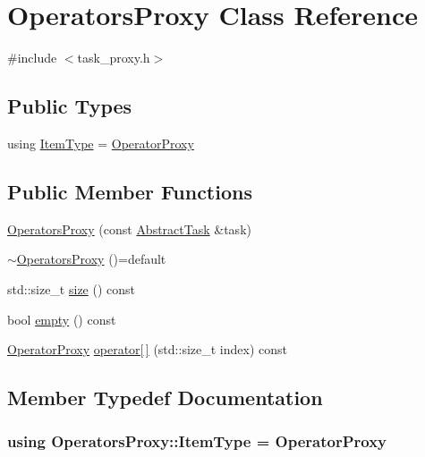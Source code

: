 \hypertarget{classOperatorsProxy}{\section{Operators\-Proxy Class Reference}
\label{classOperatorsProxy}
}


{\ttfamily \#include $<$task\-\_\-proxy.\-h$>$}

\subsection*{Public Types}
\begin{DoxyCompactItemize}
\item 
using \hyperlink{classOperatorsProxy_a939f7923474cafe6703e8d751a4ec214}{Item\-Type} = \hyperlink{classOperatorProxy}{Operator\-Proxy}
\end{DoxyCompactItemize}
\subsection*{Public Member Functions}
\begin{DoxyCompactItemize}
\item 
\hyperlink{classOperatorsProxy_abe16280c73e618d235befc07d32d499f}{Operators\-Proxy} (const \hyperlink{classAbstractTask}{Abstract\-Task} \&task)
\item 
\hyperlink{classOperatorsProxy_a3fa76f822ca3a49c5aa4f0ed029df8c9}{$\sim$\-Operators\-Proxy} ()=default
\item 
std\-::size\-\_\-t \hyperlink{classOperatorsProxy_a25f2894eab5294000cabbd01557e08f8}{size} () const 
\item 
bool \hyperlink{classOperatorsProxy_af3146b105a508de47adce891272c4307}{empty} () const 
\item 
\hyperlink{classOperatorProxy}{Operator\-Proxy} \hyperlink{classOperatorsProxy_a153274802a51f1560fbfb09a0199c9eb}{operator\mbox{[}$\,$\mbox{]}} (std\-::size\-\_\-t index) const 
\end{DoxyCompactItemize}


\subsection{Member Typedef Documentation}
\hypertarget{classOperatorsProxy_a939f7923474cafe6703e8d751a4ec214}{
\subsubsection[{Item\-Type}]{\setlength{\rightskip}{0pt plus 5cm}using {\bf Operators\-Proxy\-::\-Item\-Type} =  {\bf Operator\-Proxy}}}\label{classOperatorsProxy_a939f7923474cafe6703e8d751a4ec214}


